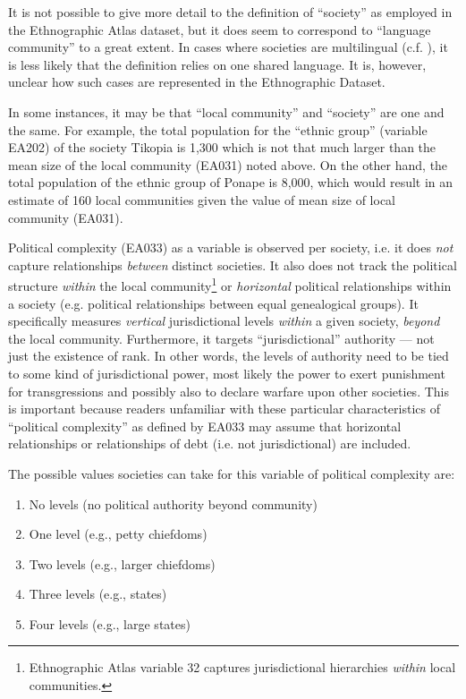 \documentclass[a4paper,10pt]{article} %
\begin{document}
It is not possible to give more detail to the definition of ``society'' as employed in the Ethnographic Atlas dataset, but it does seem to correspond to ``language community'' to a great extent. In cases where societies are multilingual (c.f. \citet{evans2017did}), it is less likely that the definition relies on one shared language. It is, however, unclear how such cases are represented in the Ethnographic Dataset.

In some instances, it may be that ``local community'' and ``society'' are one and the same. For example, the total population for the ``ethnic group'' (variable EA202) of the society Tikopia is 1,300 which is not that much larger than the mean size of the local community (EA031) noted above. On the other hand, the total population of the ethnic group of Ponape is 8,000, which would result in an estimate of 160 local communities given the value of mean size of local community (EA031).
  
Political complexity (EA033) as a variable is observed per society, i.e. it does \emph{not} capture relationships \emph{between} distinct societies. It also does not track the political structure \emph{within} the local community\footnote{Ethnographic Atlas variable 32 captures jurisdictional hierarchies \emph{within} local communities.} or \emph{horizontal} political relationships within a society (e.g. political relationships between equal genealogical groups). It specifically measures \emph{vertical} jurisdictional levels \emph{within} a given society, \emph{beyond} the local community. Furthermore, it targets ``jurisdictional'' authority --- not just the existence of rank. In other words, the levels of authority need to be tied to some kind of jurisdictional power, most likely the power to exert punishment for transgressions and possibly also to declare warfare upon other societies. This is important because readers unfamiliar with these particular characteristics of ``political complexity'' as defined by EA033 may assume that horizontal relationships or relationships of debt (i.e. not jurisdictional) are included. 

The possible values societies can take for this variable of political complexity are:

\begin{enumerate}
\item No levels (no political authority beyond community)
\item One level (e.g., petty chiefdoms)
\item Two levels (e.g., larger chiefdoms)
\item Three levels (e.g., states) 
\item Four levels (e.g., large states)
\end{enumerate}
\end{document}
